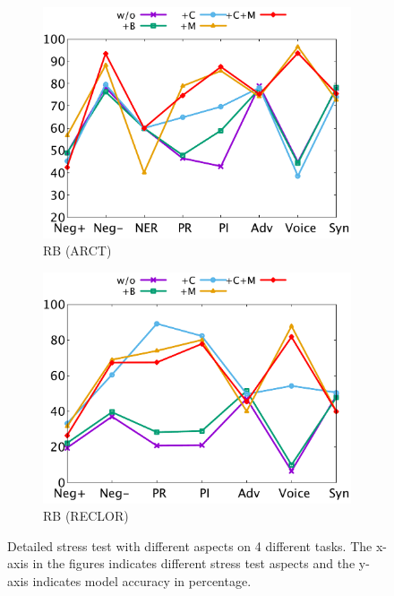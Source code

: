\begin{figure}[th]
\begin{subfigure}[b]{0.24\textwidth}
\includegraphics[width=\columnwidth]{data/arct_roberta.pdf}
\caption{RB (ARCT)}
\label{fig:arct_roberta}
\end{subfigure}
\hfill
\begin{subfigure}[b]{0.24\textwidth}
\centering
\includegraphics[width=\columnwidth]{data/reclor_roberta.pdf}
\caption{RB (RECLOR)}
\label{fig:arct_roberta}
\end{subfigure}
\caption{Detailed stress test with different aspects on 4 different tasks. The x-axis in the figures indicates different stress test aspects and the y-axis indicates model accuracy in percentage.}
\label{fig:detail_stress}
\end{figure}

